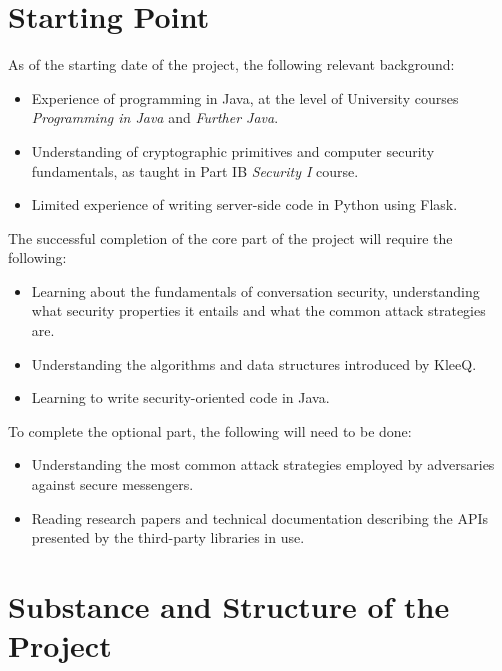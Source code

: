 \documentclass[a4paper, twoside, 12pt]{report}
\begin{document}
\begin{appendices}
\section{Starting Point}
As of the starting date of the project, the following relevant background:
\begin{itemize}
    \item Experience of programming in Java, at the level of University courses \emph{Programming in Java} and \emph{Further Java}.
    \item Understanding of cryptographic primitives and computer security fundamentals, as taught in Part IB \emph{Security I} course.
    \item Limited experience of writing server-side code in Python using Flask.
\end{itemize}
\vspace{\baselineskip}


\noindent
The successful completion of the core part of the project will require the following:
\begin{itemize}
    \item Learning about the fundamentals of conversation security, understanding what security properties it entails and what the common attack strategies are.
    \item Understanding the algorithms and data structures introduced by KleeQ.
    \item Learning to write security-oriented code in Java.
\end{itemize}

\noindent
To complete the optional part, the following will need to be done:
\begin{itemize}
    \item Understanding the most common attack strategies employed by adversaries against secure messengers.
    \item Reading research papers and technical documentation describing the APIs presented by the third-party libraries in use.
\end{itemize}


\section{Substance and Structure of the Project}

\end{appendices}
\end{document}
